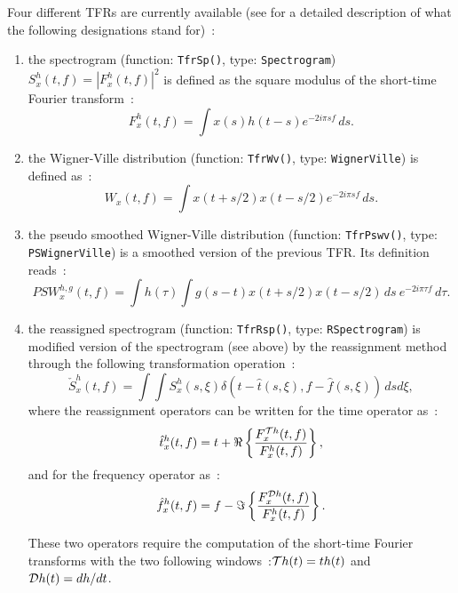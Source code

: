 \documentclass{article}
\begin{document}
Four different TFRs are currently available (see
\cite{flandrin99:tf_ts} for a detailed description of what the
following designations stand for)~:
\begin{enumerate}
\item the spectrogram (function:
  \texttt{TfrSp()}, type: \texttt{Spectrogram})
  $S_x^h(t,f)=|F_x^h(t,f)|^2$ is defined as the
  square modulus of the short-time Fourier transform~:
\begin{equation}
\label{sp}
F_x^h(t,f)=\int{x(s)h(t-s)e^{-2i\pi sf}\,ds}.
\end{equation}
\item the Wigner-Ville distribution (function: \texttt{TfrWv()}, type:
\texttt{WignerVille}) is defined as~:
\begin{equation}
\label{wv}
W_x(t,f)=\int{x(t+s/2)x(t-s/2)e^{-2i\pi sf}\,ds}.
\end{equation}
\item the pseudo smoothed Wigner-Ville distribution (function:
\texttt{TfrPswv()}, type: \texttt{PSWignerVille}) is a smoothed
version of the previous TFR. Its definition reads~:
\begin{equation}
\label{pswv}
PSW_x^{h,g}(t,f)=\int{h(\tau)\int{g(s-t)x(t+s/2)x(t-s/2)\,ds}\:e^{-2i\pi \tau 
f}\,d\tau}.
\end{equation}
\item the reassigned spectrogram (function: \texttt{TfrRsp()}, type:
\texttt{RSpectrogram}) is modified version of the spectrogram (see
above) by the reassignment method through the following transformation
operation~:
\begin{equation}
\label{rsp}
\check{S}_x^h(t,f)=\int{\!\!\!\int{S_x^{h}(s,\xi)\delta(t-\hat{t}(s,\xi),f-\hat{f}(s,\xi))\,dsd\xi}},
\end{equation}
where the reassignment operators can be written for the time operator as~:
\begin{equation}
\hat{t}_x^{h}(t,f)=t+\Re\left\{\frac{F_x^{{\cal T}h}(t,f)}{F_x^h(t,f)}\right\},
\end{equation}
and for the frequency operator as~:
\begin{equation}
\hat{f}_x^{h}(t,f)=f-\Im\left\{\frac{F_x^{{\cal D}h}(t,f)}{F_x^h(t,f)}\right\}.
\end{equation}

These two operators require the computation of the short-time Fourier
transforms with the two following windows~:${\cal T}h(t)=t
h(t)$ and ${\cal D}h(t)=dh/dt$.
\end{enumerate}
\end{document}
